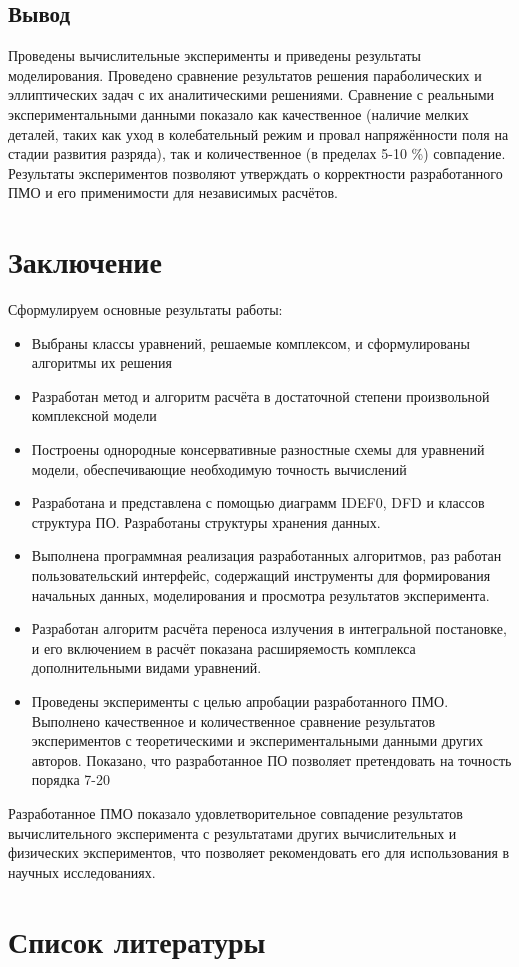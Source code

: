 \subsection{Вывод}
Проведены вычислительные эксперименты и приведены результаты моделирования.
Проведено сравнение результатов решения параболических и эллиптических задач с 
их аналитическими решениями.
Сравнение с реальными экспериментальными данными показало как качественное 
(наличие мелких деталей, таких как уход в колебательный режим и провал 
напряжённости поля на стадии развития разряда), так и количественное (в 
пределах 5-10 \%) совпадение.
Результаты экспериментов позволяют утверждать о корректности разработанного ПМО 
и его применимости для независимых расчётов.

\section{Заключение}
Сформулируем основные результаты работы:
\begin{itemize}
    \item Выбраны классы уравнений, решаемые комплексом, и сформулированы 
    алгоритмы их решения
    \item Разработан метод и алгоритм расчёта в достаточной степени 
    произвольной комплексной модели
    \item Построены однородные консервативные разностные схемы для уравнений 
    модели, обеспечивающие необходимую точность вычислений
    \item Разработана и представлена с помощью диаграмм IDEF0, DFD и классов 
    структура ПО. Разработаны структуры хранения данных.
    \item Выполнена программная реализация разработанных алгоритмов, раз    
    работан пользовательский интерфейс, содержащий инструменты для формирования 
    начальных данных, моделирования и просмотра результатов эксперимента.
    \item Разработан алгоритм расчёта переноса излучения в интегральной 
    постановке, и его включением в расчёт показана расширяемость комплекса 
    дополнительными видами уравнений.
    \item Проведены эксперименты с целью апробации разработанного ПМО. 
    Выполнено качественное и количественное сравнение результатов экспериментов 
    с теоретическими и экспериментальными данными других авторов. Показано, что 
    разработанное ПО позволяет претендовать на точность порядка 7-20%
\end{itemize}

Разработанное ПМО показало удовлетворительное совпадение результатов 
вычислительного эксперимента с результатами других вычислительных и физических 
экспериментов, что позволяет рекомендовать его для использования в научных 
исследованиях.

\section{Список литературы}
\printbibliography[heading=none]


